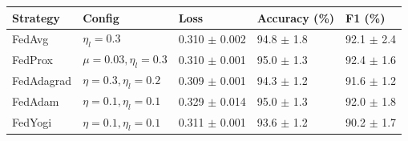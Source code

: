 \begin{tabular}{lllll}
\toprule
Strategy & Config & Loss & Accuracy (\%) & F1 (\%) \\
\midrule
FedAvg & $\eta_l=0.3$ & 0.310 $\pm$ 0.002 & 94.8 $\pm$ 1.8 & 92.1 $\pm$ 2.4 \\
FedProx & $\mu=0.03, \eta_l=0.3$ & 0.310 $\pm$ 0.001 & 95.0 $\pm$ 1.3 & 92.4 $\pm$ 1.6 \\
FedAdagrad & $\eta=0.3, \eta_l=0.2$ & 0.309 $\pm$ 0.001 & 94.3 $\pm$ 1.2 & 91.6 $\pm$ 1.2 \\
FedAdam & $\eta=0.1, \eta_l=0.1$ & 0.329 $\pm$ 0.014 & 95.0 $\pm$ 1.3 & 92.0 $\pm$ 1.8 \\
FedYogi & $\eta=0.1, \eta_l=0.1$ & 0.311 $\pm$ 0.001 & 93.6 $\pm$ 1.2 & 90.2 $\pm$ 1.7 \\
\bottomrule
\end{tabular}
